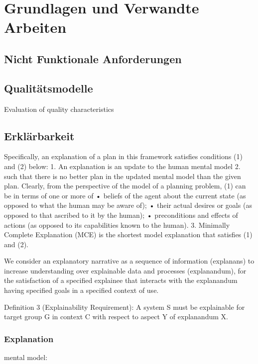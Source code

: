 \chapter{Grundlagen und Verwandte Arbeiten}

\section{Nicht Funktionale Anforderungen}

\cite{chung2009non}

\cite{schneider2012abenteuer}

\section{Qualitätsmodelle}

\cite{schneider2012abenteuer}

Evaluation of quality characteristics

\section{Erklärbarkeit}

Specifically, an explanation of a plan in this framework satisfies conditions (1) and (2) below: 1. An explanation is an update to the human mental model 2. such that there is no better plan in the updated mental model than the given plan. Clearly, from the perspective of the model of a planning problem, (1) can be in terms of one or more of • beliefs of the agent about the current state (as opposed to what the human may be aware of); • their actual desires or goals (as opposed to that ascribed to it by the human); • preconditions and effects of actions (as opposed to its capabilities known to the human). 3. Minimally Complete Explanation (MCE) is the shortest model explanation that satisfies (1) and (2). \cite{zahedi_towards_2019}

We consider an explanatory narrative as a sequence of information (explanans) to increase understanding over explainable data and processes (explanandum), for the satisfaction of a specified explainee that interacts with the explanandum having specified goals in a specified context of use. \cite{sovrano_modelling_2020}

\cite{chazette_end-users_nodate}

\cite{chazette2020explainability}

Definition 3 (Explainability Requirement): A system S must be explainable for target group G in context C with respect to aspect Y of explanandum X. \cite{kohl_explainability_2019}

\subsection{Explanation}

\cite{chazette_knowledge_nodate}

\cite{kohl_explainability_2019}

mental model: \cite{chi_three_nodate}